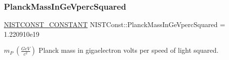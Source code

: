 \subsubsection{\texorpdfstring{Planck\+Mass\+In\+Ge\+Vperc\+Squared}{PlanckMassInGeVpercSquared}}
{\footnotesize\ttfamily \mbox{\hyperlink{group___n_i_s_t_const-_macros_ga2b0fc1d7452373f816175dd86ce26729}{N\+I\+S\+T\+C\+O\+N\+S\+T\+\_\+\+C\+O\+N\+S\+T\+A\+NT}} N\+I\+S\+T\+Const\+::\+Planck\+Mass\+In\+Ge\+Vperc\+Squared = 1.\+220910e19}

$m_P \ (\frac{GeV}{c^2})$ Planck mass in gigaelectron volts per speed of light squared. 